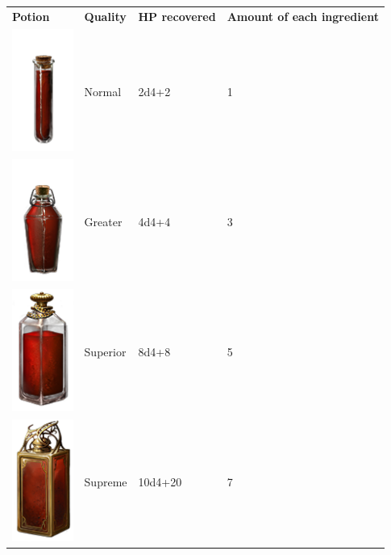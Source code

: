 \begin{tabular}{m{2cm}m{3cm}m{4cm}m{4cm} } 
	\textbf{Potion} & \textbf{Quality} & \textbf{HP recovered} & \textbf{Amount of each ingredient} \\
	\includegraphics[width=2cm]{../Pictures/Gameplay/Items/Consumables/Potions/Normal_healing_potion_picture.png} & Normal & 2d4+2  & 1  \\
	\includegraphics[width=2cm]{../Pictures/Gameplay/Items/Consumables/Potions/Greater_healing_potion_picture.png} & Greater & 4d4+4 & 3 \\
	\includegraphics[width=2cm]{../Pictures/Gameplay/Items/Consumables/Potions/Superior_healing_potion_picture.png} & Superior & 8d4+8 & 5 \\
	\includegraphics[width=2cm]{../Pictures/Gameplay/Items/Consumables/Potions/Supreme_healing_potion_picture.png} & Supreme & 10d4+20 & 7 \\
\end{tabular}

\clearpage